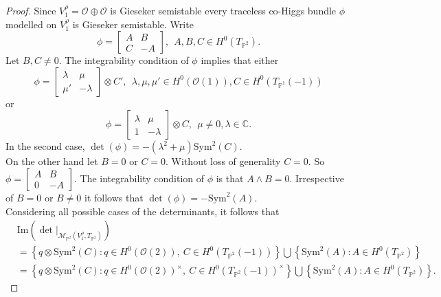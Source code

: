 \documentclass[10pt,a4paper]{amsart}
\begin{document}
\begin{proof}
Since $V_1^\rho = \mathcal{O}\oplus\mathcal{O}$ is Gieseker semistable every traceless co-Higgs bundle $\phi$ modelled on $V_1^\rho$ is Gieseker semistable. Write 
\begin{equation}
\phi = \begin{bmatrix}
  A & B\\
    C & -A
\end{bmatrix},~~ A, B, C\in H^0(T_{\mathbb{P}^2}). 
\end{equation}
Let $B, C\neq 0$. The integrability condition of $\phi$ implies that either 
\begin{equation}
\phi = \begin{bmatrix}
    \lambda & \mu\\
    \mu' & -\lambda
\end{bmatrix}\otimes C',~~ \lambda, \mu, \mu'\in H^0(\mathcal{O}(1)), C\in H^0(T_{\mathbb{P}^1}(-1))
\end{equation}
or 
\begin{equation}
\phi = \begin{bmatrix}
    \lambda & \mu\\
    1 & -\lambda
\end{bmatrix}\otimes C ,~~\mu\neq 0, \lambda\in\mathbb{C}.
\end{equation}
In the second case, $\det(\phi) = -(\lambda^2 + \mu)\mbox{Sym}^2(C)$. \\

On the other hand let $B = 0$ or $C = 0$. Without loss of generality $C=0$. So $\phi = \begin{bmatrix}
    A & B\\
    0 & -A
\end{bmatrix}.$ The integrability condition of $\phi$ is that $A\wedge B = 0$. Irrespective of $B=0$ or $B\neq 0$ it follows that $\det(\phi) = -\mbox{Sym}^2(A)$.\\

Considering all possible cases of the determinants, it follows that \begin{align*}
&\mbox{Im}\left(\det|_{\mathcal{M}_{\mathbb{P}^2}(V_1^\rho, T_{\mathbb{P}^2})}\right)\\
&= \left\{q\otimes\mbox{Sym}^2(C): q\in H^0(\mathcal{O}(2)),~ C\in H^0(T_{\mathbb{P}^2}(-1))\right\}\bigcup \left\{\mbox{Sym}^2(A): A\in H^0(T_{\mathbb{P}^2})\right\}\\
&= \left\{q\otimes\mbox{Sym}^2(C): q\in H^0(\mathcal{O}(2))^\times,~ C\in H^0(T_{\mathbb{P}^2}(-1))^\times\right\}\bigcup \left\{\mbox{Sym}^2(A): A\in H^0(T_{\mathbb{P}^2})\right\}.
\end{align*}


\end{proof}
\end{document}
